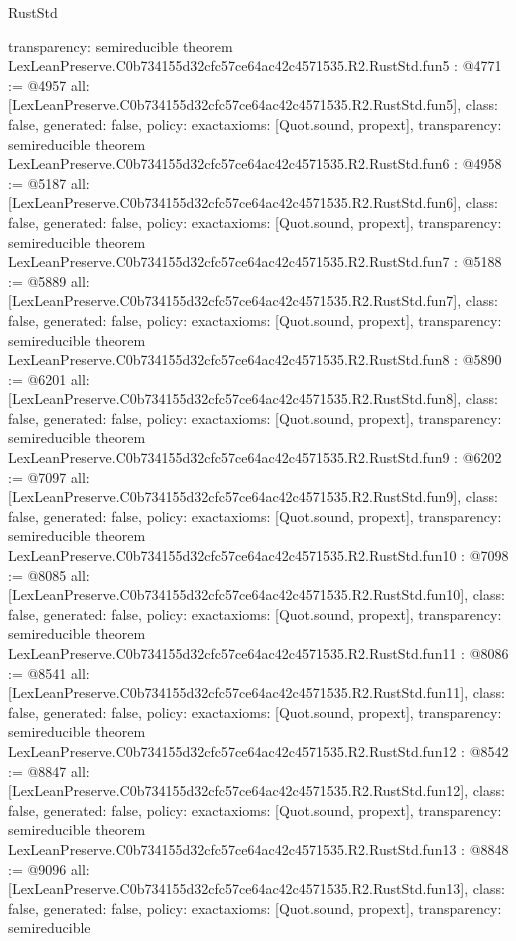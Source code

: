 \begin{lexlean}{RustStd}
\begin{coremodule}
{  transparency: semireducible
}
theorem LexLeanPreserve.C0b734155d32cfc57ce64ac42c4571535.R2.RustStd.fun5 : @4771 := @4957 {
  all: [LexLeanPreserve.C0b734155d32cfc57ce64ac42c4571535.R2.RustStd.fun5],
  class: false,
  generated: false,
  policy: exact{axioms: [Quot.sound, propext]},
  transparency: semireducible
}
theorem LexLeanPreserve.C0b734155d32cfc57ce64ac42c4571535.R2.RustStd.fun6 : @4958 := @5187 {
  all: [LexLeanPreserve.C0b734155d32cfc57ce64ac42c4571535.R2.RustStd.fun6],
  class: false,
  generated: false,
  policy: exact{axioms: [Quot.sound, propext]},
  transparency: semireducible
}
theorem LexLeanPreserve.C0b734155d32cfc57ce64ac42c4571535.R2.RustStd.fun7 : @5188 := @5889 {
  all: [LexLeanPreserve.C0b734155d32cfc57ce64ac42c4571535.R2.RustStd.fun7],
  class: false,
  generated: false,
  policy: exact{axioms: [Quot.sound, propext]},
  transparency: semireducible
}
theorem LexLeanPreserve.C0b734155d32cfc57ce64ac42c4571535.R2.RustStd.fun8 : @5890 := @6201 {
  all: [LexLeanPreserve.C0b734155d32cfc57ce64ac42c4571535.R2.RustStd.fun8],
  class: false,
  generated: false,
  policy: exact{axioms: [Quot.sound, propext]},
  transparency: semireducible
}
theorem LexLeanPreserve.C0b734155d32cfc57ce64ac42c4571535.R2.RustStd.fun9 : @6202 := @7097 {
  all: [LexLeanPreserve.C0b734155d32cfc57ce64ac42c4571535.R2.RustStd.fun9],
  class: false,
  generated: false,
  policy: exact{axioms: [Quot.sound, propext]},
  transparency: semireducible
}
theorem LexLeanPreserve.C0b734155d32cfc57ce64ac42c4571535.R2.RustStd.fun10 : @7098 := @8085 {
  all: [LexLeanPreserve.C0b734155d32cfc57ce64ac42c4571535.R2.RustStd.fun10],
  class: false,
  generated: false,
  policy: exact{axioms: [Quot.sound, propext]},
  transparency: semireducible
}
theorem LexLeanPreserve.C0b734155d32cfc57ce64ac42c4571535.R2.RustStd.fun11 : @8086 := @8541 {
  all: [LexLeanPreserve.C0b734155d32cfc57ce64ac42c4571535.R2.RustStd.fun11],
  class: false,
  generated: false,
  policy: exact{axioms: [Quot.sound, propext]},
  transparency: semireducible
}
theorem LexLeanPreserve.C0b734155d32cfc57ce64ac42c4571535.R2.RustStd.fun12 : @8542 := @8847 {
  all: [LexLeanPreserve.C0b734155d32cfc57ce64ac42c4571535.R2.RustStd.fun12],
  class: false,
  generated: false,
  policy: exact{axioms: [Quot.sound, propext]},
  transparency: semireducible
}
theorem LexLeanPreserve.C0b734155d32cfc57ce64ac42c4571535.R2.RustStd.fun13 : @8848 := @9096 {
  all: [LexLeanPreserve.C0b734155d32cfc57ce64ac42c4571535.R2.RustStd.fun13],
  class: false,
  generated: false,
  policy: exact{axioms: [Quot.sound, propext]},
  transparency: semireducible
}
\end{coremodule}
\end{lexlean}
